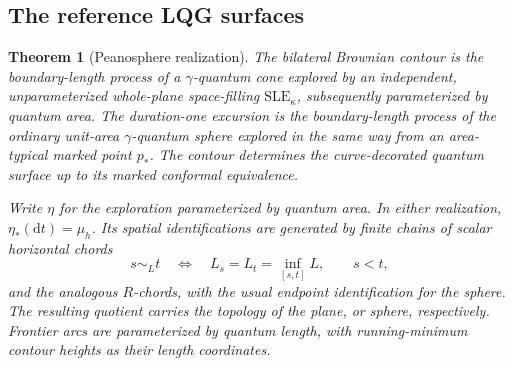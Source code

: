\documentclass[11pt]{article}
\numberwithin{equation}{section}
\newtheorem{theorem}{Theorem}[section]
\theoremstyle{definition}
\theoremstyle{remark}
\newcommand{\dd}{\mathrm d}
\newcommand{\1}{\mathbf 1}
\begin{document}
\subsection{The reference LQG surfaces}

\begin{theorem}[Peanosphere realization]\label{enc:peanosphere}
The bilateral Brownian contour is the boundary-length process of a
$\gamma$-quantum cone explored by an independent, unparameterized
whole-plane space-filling $\mathrm{SLE}_{\kappa}$, subsequently
parameterized by quantum area.  The duration-one excursion is the
boundary-length process of the ordinary unit-area $\gamma$-quantum sphere
explored in the same way from an area-typical marked point $p_*$.
The contour determines the curve-decorated quantum surface up to its
marked conformal equivalence.

Write $\eta$ for the exploration parameterized by quantum area.
In either realization, $\eta_*(\dd t)=\mu_h$.  Its spatial identifications
are generated by finite chains of scalar horizontal chords
\begin{equation}\label{enc:chord-rule}
 s\sim_L t\quad\Longleftrightarrow\quad
 L_s=L_t=\inf_{[s,t]}L,
 \qquad s<t,
\end{equation}
and the analogous $R$-chords, with the usual endpoint identification for
the sphere.  The resulting quotient carries the topology of the plane,
or sphere, respectively.  Frontier arcs are parameterized by quantum
length, with running-minimum contour heights as their length coordinates.
\end{theorem}
\end{document}
